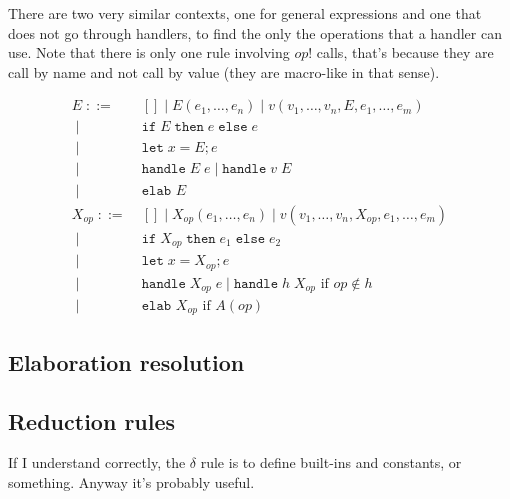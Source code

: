 \documentclass{article}
\newcommand\kw[1]{\mathbf{\mathtt{#1}}\;}
\newcommand\IS{\mathbin{\;::=\;}}
\newcommand\OR{\mathbin{\;|\;}}
\newcommand\val{\kw{let}}
\newcommand\cond[3]{\kw{if} #1\;\kw{then} #2\;\kw{else} #3}
\newcommand\handle[2]{\kw{handle} #1\;#2}
\newcommand\elab[2][]{\kw{elab_{#1}}#2}
\begin{document}
There are two very similar contexts, one for general expressions and one that does not go through handlers, to find the only the operations that a handler can use. Note that there is only one rule involving $op!$ calls, that's because they are call by name and not call by value (they are macro-like in that sense).

\begin{align*}
    E
        \IS & [] \OR E(e_1,\dots, e_n) \OR v(v_1,\dots,v_n,E,e_1,\dots,e_m) \\
        \OR & \cond{E}{e}{e} \\
        \OR & \val x = E; e \\
        \OR & \handle E e \OR \handle v E \\
        \OR & \elab E \\
    X_{op}
        \IS & [] \OR X_{op}(e_1, \dots, e_n) \OR v(v_1, \dots, v_n, X_{op}, e_1, \dots, e_m) \\
        \OR & \cond{X_{op}}{e_1}{e_2} \\
        \OR & \val x = X_{op}; e \\
        \OR & \handle{X_{op}}{e} \OR \handle{h}{X_{op}} \text{ if } op\not\in h \\
        \OR & \elab X_{op} \text{ if } A(op)
\end{align*}

\subsection{Elaboration resolution}

\subsection{Reduction rules}

If I understand correctly, the $\delta$ rule is to define built-ins and constants, or something. Anyway it's probably useful.
\end{document}
